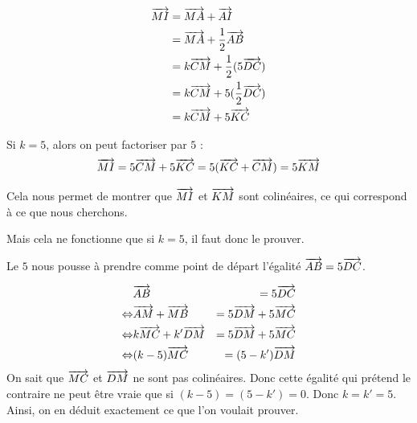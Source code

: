 \documentclass{poly}
\begin{document}

\begin{equation*}
\begin{aligned}
\overrightarrow{MI} &= \overrightarrow{MA} + \overrightarrow{AI}\\
&= \overrightarrow{MA} + \dfrac{1}{2}\overrightarrow{AB}\\
&= k\overrightarrow{CM} + \dfrac{1}{2}(5\overrightarrow{DC})\\
&= k\overrightarrow{CM} + 5(\dfrac{1}{2}\overrightarrow{DC})\\
&= k\overrightarrow{CM} + 5\overrightarrow{KC}
\end{aligned}
\end{equation*}

Si $k = 5$, alors on peut factoriser par $5$ :
\begin{equation*}
\overrightarrow{MI} = 5\overrightarrow{CM} + 5\overrightarrow{KC} = 5(\overrightarrow{KC} + \overrightarrow{CM}) = 5\overrightarrow{KM}  
\end{equation*}

Cela nous permet de montrer que $\overrightarrow{MI}$ et $\overrightarrow{KM}$ sont colinéaires, ce qui correspond à ce que nous cherchons.

Mais cela ne fonctionne que si $k = 5$, il faut donc le prouver. 

Le $5$ nous pousse à prendre comme point de départ l'égalité $\overrightarrow{AB} = 5\overrightarrow{DC}$.

\begin{equation*}
\begin{aligned}
&\overrightarrow{AB} &= 5\overrightarrow{DC}\\
\Leftrightarrow&\overrightarrow{AM} + \overrightarrow{MB} &= 5\overrightarrow{DM} + 5\overrightarrow{MC}\\
\Leftrightarrow&k\overrightarrow{MC} + k'\overrightarrow{DM} &= 5\overrightarrow{DM} + 5\overrightarrow{MC}\\
\Leftrightarrow&(k-5)\overrightarrow{MC} &= (5 - k')\overrightarrow{DM}\\
\end{aligned}
\end{equation*}
On sait que $\overrightarrow{MC}$ et $\overrightarrow{DM}$ ne sont pas colinéaires. Donc cette égalité qui prétend le contraire ne peut être vraie que si $(k - 5) = (5 - k') = 0$. Donc $k = k' = 5$. Ainsi, on en déduit exactement ce que l'on voulait prouver.
\end{document}
